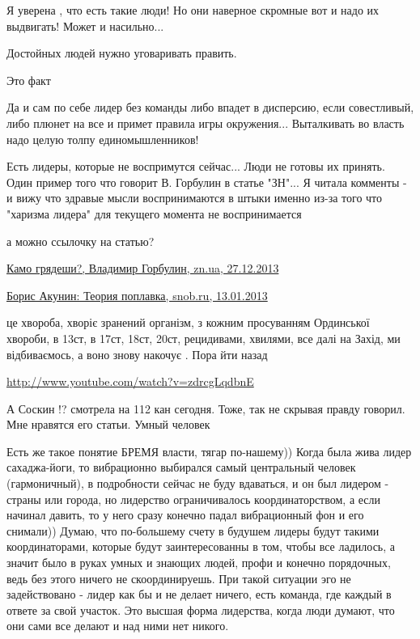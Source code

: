 \begin{itemize}
Я уверена , что есть такие люди! Но они наверное скромные вот и надо их выдвигать! Может и насильно...

Достойных людей нужно уговаривать править.

Это факт


Да и сам по себе лидер без команды либо впадет в дисперсию, если совестливый,
либо плюнет на все и примет правила игры окружения... Выталкивать во власть
надо целую толпу единомышленников!



Есть лидеры, которые не воспримутся сейчас... Люди не готовы их принять. Один
пример того что говорит В. Горбулин в статье "ЗН"... Я читала комменты - и вижу
что здравые мысли воспринимаются в штыки именно из-за того что "харизма лидера"
для текущего момента не воспринимается

а можно ссылочку на статью?


\href{http://gazeta.zn.ua/internal/kamo-gryadeshi-_.html}{%
Камо грядеши?, Владимир Горбулин, zn.ua, 27.12.2013%
}


\href{http://www.snob.ru/profile/5232/blog/56510}{%
Борис Акунин: Теория поплавка, snob.ru, 13.01.2013%
}

це хвороба, хворіє зранений
організм, з кожним просуванням Ординської хвороби, в 13ст, в 17ст, 18ст, 20ст,
рецидивами, хвилями, все далі на Захід, ми відбиваємось, а воно знову накочує .
Пора йти назад 

\url{http://www.youtube.com/watch?v=zdrcgLqdbnE}


А Соскин !? смотрела на 112 кан сегодня. Тоже, так не скрывая правду говорил.
Мне нравятся его статьи. Умный человек



Есть же такое понятие БРЕМЯ власти, тягар по-нашему)) Когда была жива лидер
сахаджа-йоги, то вибрационно выбирался самый центральный человек (гармоничный), в
подробности сейчас не буду вдаваться, и он был лидером - страны или города, но
лидерство ограничивалось координаторством, а если начинал давить, то у него сразу
конечно падал вибрационный фон и его снимали)) Думаю, что по-большему счету в
будушем лидеры будут такими координаторами, которые будут заинтересованны в
том, чтобы все ладилось, а значит было в руках умных и знающих людей, профи и
конечно порядочных, ведь без этого ничего не скоординируешь. При такой ситуации
эго не задействовано - лидер как бы и не делает ничего, есть команда, где каждый
в ответе за свой участок. Это высшая форма лидерства, когда люди думают, что они
сами все делают и над ними нет никого.


\end{itemize}

